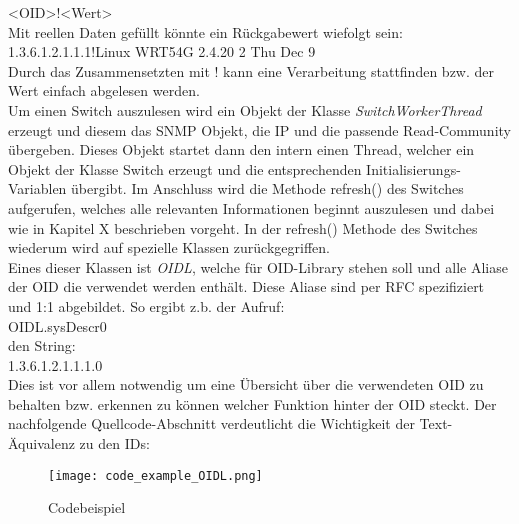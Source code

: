 <OID>!<Wert>\\

Mit reellen Daten gefüllt könnte ein Rückgabewert wiefolgt sein:\\

1.3.6.1.2.1.1.1!Linux WRT54G 2.4.20 2 Thu Dec 9\\


Durch das Zusammensetzten mit ! kann eine Verarbeitung stattfinden bzw. der Wert einfach abgelesen werden.\\
Um einen Switch auszulesen wird ein Objekt der Klasse \textit{SwitchWorkerThread} erzeugt und diesem das SNMP Objekt, die IP und die passende Read-Community übergeben. Dieses Objekt startet dann den intern einen Thread, welcher ein Objekt der Klasse Switch erzeugt und die entsprechenden Initialisierungs-Variablen übergibt. Im Anschluss wird die Methode refresh() des Switches aufgerufen, welches alle relevanten Informationen beginnt auszulesen und dabei wie in Kapitel X beschrieben vorgeht. In der refresh() Methode des Switches wiederum wird auf spezielle Klassen zurückgegriffen.\\
Eines dieser Klassen ist \textit{OIDL}, welche für OID-Library stehen soll und alle Aliase der OID die verwendet werden enthält. Diese Aliase sind per RFC spezifiziert und 1:1 abgebildet. So ergibt z.b. der Aufruf: \\

OIDL.sysDescr0\\

den String:\\

1.3.6.1.2.1.1.1.0\\

Dies ist vor allem notwendig um eine Übersicht über die verwendeten OID zu behalten bzw. erkennen zu können welcher Funktion hinter der OID steckt. Der nachfolgende Quellcode-Abschnitt verdeutlicht die Wichtigkeit der Text-Äquivalenz zu den IDs:\\

\begin{figure}[H]
\centering
\texttt{[image: code\_example\_OIDL.png]}
\caption{Codebeispiel}
\label{fig:classdiagramcode}
\end{figure}

